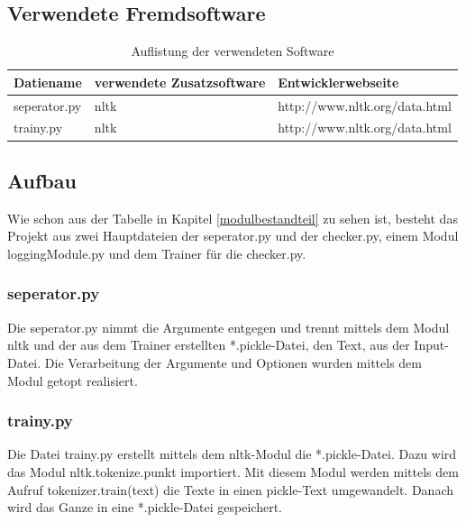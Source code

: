 \documentclass[12pt]{scrartcl}
\begin{document}
\subsection{Verwendete Fremdsoftware}
\label{sec:technical-background-additional-software}
\begin{table}[H]
\centering

\label{additional-software-table}
\begin{tabular}{|l|l|l|}
\hline
\rowcolor[HTML]{C0C0C0} 
Datiename  & verwendete Zusatzsoftware & {\color[HTML]{000000} Entwicklerwebseite}     \\ \hline
seperator.py  & nltk                    & http://www.nltk.org/data.html           \\ \hline
trainy.py & nltk     & http://www.nltk.org/data.html              \\ \hline
\end{tabular}
\caption{Auflistung der verwendeten Software}
\end{table}
\subsection{Aufbau}
\label{sec:technical-background-aufbau}
Wie schon aus der Tabelle in Kapitel \ref{modulbestandteil} zu sehen ist, besteht das Projekt aus zwei Hauptdateien der seperator.py und der checker.py, einem Modul loggingModule.py und dem Trainer für die checker.py.
\subsubsection{seperator.py}
\label{sec:technical-background-seperator}
Die seperator.py nimmt die Argumente entgegen und trennt mittels dem Modul nltk und der aus dem Trainer erstellten *.pickle-Datei, den Text, aus der Input-Datei.   
Die Verarbeitung der Argumente und Optionen wurden mittels dem Modul getopt realisiert.
\subsubsection{trainy.py}
\label{sec:technical-background-trainy}
Die Datei trainy.py erstellt mittels dem nltk-Modul die *.pickle-Datei. Dazu wird das Modul nltk.tokenize.punkt importiert. Mit diesem Modul werden mittels dem Aufruf tokenizer.train(text) die Texte in einen pickle-Text umgewandelt. Danach wird das Ganze in eine *.pickle-Datei gespeichert.   
\end{document}
